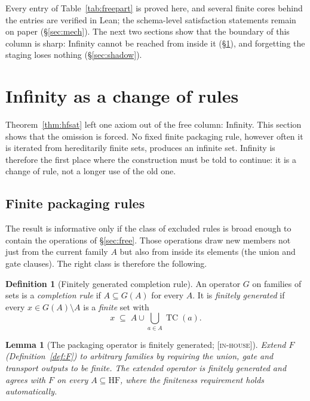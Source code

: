 \documentclass[11pt]{article}
\newcommand{\HF}{\mathrm{HF}}                 \newcommand{\rank}{\operatorname{rank}}
\newcommand{\TC}{\operatorname{TC}}
\newcommand{\gradetag}[1]{\textnormal{\textsc{[#1]}}}
\newcommand{\inhouse}{\gradetag{in-house}}
\newtheorem{lemma}[theorem]{Lemma}
\theoremstyle{definition}
\newtheorem{definition}[theorem]{Definition}
\begin{document}
Every entry of Table~\ref{tab:freepart} is proved here, and several finite cores behind the
entries are verified in Lean; the schema-level satisfaction statements remain on paper
(\S\ref{sec:mech}). The next two sections show that the boundary of this column is sharp:
Infinity cannot be reached from inside it (\S\ref{sec:infinity}), and forgetting the staging
loses nothing (\S\ref{sec:shadow}).
 \section{Infinity as a change of rules}\label{sec:infinity}

Theorem~\ref{thm:hfsat} left one axiom out of the free column: Infinity. This section shows that
the omission is forced. No fixed finite packaging rule, however often it is iterated from
hereditarily finite sets, produces an infinite set. Infinity is therefore the first place where
the construction must be told to continue: it is a change of rule, not a longer use of the old
one.

\subsection{Finite packaging rules}

The result is informative only if the class of excluded rules is broad enough to contain the
operations of \S\ref{sec:free}. Those operations draw new members not just from the current
family $A$ but also from inside its elements (the union and gate clauses). The right class is
therefore the following.

\begin{definition}[Finitely generated completion rule]\label{def:fg}
An operator $G$ on families of sets is a \emph{completion rule} if $A\subseteq G(A)$ for every
$A$. It is \emph{finitely generated} if every $x\in G(A)\setminus A$ is a \emph{finite} set with
\[
  x\;\subseteq\;A\cup\bigcup_{a\in A}\TC(a).
\]
\end{definition}

\begin{lemma}[The packaging operator is finitely generated; \inhouse]\label{lem:Ffg}
Extend $F$ (Definition~\ref{def:F}) to arbitrary families by requiring the union, gate and
transport outputs to be finite. The extended operator is finitely generated and agrees with $F$
on every $A\subseteq\HF$, where the finiteness requirement holds automatically.
\end{lemma}
\end{document}

